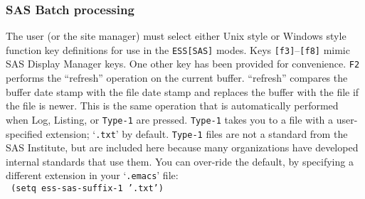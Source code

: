 \documentclass{article}
\newcommand{\stexttt}[1]{{\small\texttt{#1}}}
\newcommand{\elcode}[1]{\\{\stexttt{\hspace*{2em} #1}}\\}
\newcommand{\file}[1]{`\stexttt{#1}'}
\begin{document}
\subsubsection{SAS Batch processing}
\label{sec:SAS:proc:batch}

The user (or the site manager) must select either Unix style or
Windows style function key definitions for use in the
\stexttt{ESS[SAS]} modes.
Keys \stexttt{[f3]}--\stexttt{[f8]} mimic SAS Display Manager keys.  One
other key has been provided for convenience.  \stexttt{F2} performs the
``refresh'' operation on the current buffer.  ``refresh'' compares the
buffer date stamp with the file date stamp and replaces the buffer with
the file if the file is newer.  This is the same operation that is
automatically performed when Log, Listing, or \stexttt{Type-1} are
pressed.  \stexttt{Type-1} takes you to a file with a user-specified
extension; \file{.txt} by default.  \stexttt{Type-1} files are not a
standard from the SAS Institute, but are included here because many
organizations have developed internal standards that use them.  You can
over-ride the default, by specifying a different extension in your
\file{.emacs} file: \elcode{(setq ess-sas-suffix-1 '.txt')}
\end{document}
